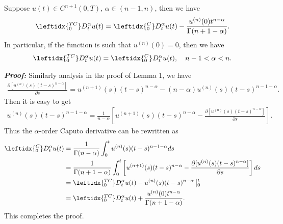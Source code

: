 \documentclass[3p,times]{elsarticle}
\begin{document}
\begin{lem}\label{le2}
Suppose $u(t)\in C^{n+1}(0,T)$, $\alpha\in(n-1,n)$, then we have
\begin{equation*}
\aligned
\leftidx{_0^{TC}}D_t^\alpha u(t)=\leftidx{_0^{C}}D_t^\alpha u(t)-\frac{u^{(n)}(0)t^{n-\alpha}}{\Gamma(n+1-\alpha)}.
\endaligned
\end{equation*}
In particular, if the function is such that $u^{(n)}(0)=0$, then we have
\begin{equation*}
\aligned
\leftidx{_0^{TC}}D_t^\alpha u(t)=\leftidx{_0^{C}}D_t^\alpha u(t),\quad n-1<\alpha<n.
\endaligned
\end{equation*}
\end{lem}
\textbf{\emph{Proof:}} Similarly analysis in the proof of Lemma 1, we have
\begin{align*}
\frac{\partial[u^{(n)}(s)(t-s)^{n-\alpha}]}{\partial s}=u^{(n+1)}(s)(t-s)^{n-\alpha}-(n-\alpha)u^{(n)}(s)(t-s)^{n-1-\alpha}.
\end{align*}
Then it is easy to get
\begin{align*}
u^{(n)}(s)(t-s)^{n-1-\alpha}=\frac{1}{n-\alpha}\left[u^{(n+1)}(s)(t-s)^{n-\alpha}-\frac{\partial[u^{(n)}(s)(t-s)^{n-\alpha}]}{\partial s}\right].
\end{align*}
Thus the $\alpha$-order Caputo derivative can be rewritten as
\begin{equation*}
\aligned
\leftidx{_0^{C}}D_t^\alpha u(t)&=\frac{1}{\Gamma(n-\alpha)}\int_0^tu^{(n)}(s)(t-s)^{n-1-\alpha}ds\\
&=\frac{1}{\Gamma(n+1-\alpha)}\int_0^t\left[u^{(n+1)}(s)(t-s)^{n-\alpha}-\frac{\partial[u^{(n)}(s)(t-s)^{n-\alpha}]}{\partial s}\right]ds\\
&=\leftidx{_0^{TC}}D_t^\alpha u(t)-u^{(n)}(s)(t-s)^{n-\alpha}\left|_0^t\right.\\
&=\leftidx{_0^{TC}}D_t^\alpha u(t)+\frac{u^{(n)}(0)t^{n-\alpha}}{\Gamma(n+1-\alpha)}.
\endaligned
\end{equation*}
This completes the proof.
\end{document}
